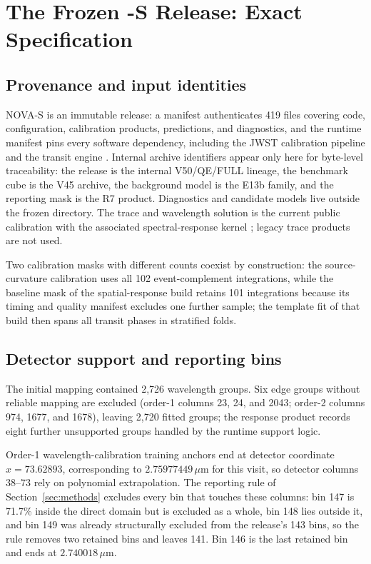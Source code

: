 \section{The Frozen \nova{}-S Release: Exact Specification}
\label{app:nova}

\subsection{Provenance and input identities}

NOVA-S is an immutable release: a manifest authenticates 419 files covering
code, configuration, calibration products, predictions, and diagnostics,
and the runtime manifest pins every software dependency, including the
JWST calibration pipeline \citep{JWSTPipeline2025} and the transit engine
\citep{Jaxoplanet2025}. Internal archive identifiers appear only here for
byte-level traceability: the release is the internal V50/QE/FULL lineage,
the benchmark cube is the V45 archive, the background model is the E13b
family, and the reporting mask is the R7 product. Diagnostics and
candidate models live outside the frozen directory. The trace and
wavelength solution is the current public calibration
\citep{BainesEtAl2023Trace,BainesEtAl2023Wavelength} with the associated
spectral-response kernel \citep{DarveauBernierEtAl2022}; legacy trace
products are not used.

Two calibration masks with different counts coexist by construction: the
source-curvature calibration uses all 102 event-complement integrations,
while the baseline mask of the spatial-response build retains 101
integrations because its timing and quality manifest excludes one further
sample; the template fit of that build then spans all transit phases in
stratified folds.

\subsection{Detector support and reporting bins}

The initial mapping contained 2{,}726 wavelength groups. Six edge groups
without reliable mapping are excluded (order-1 columns 23, 24, and 2043;
order-2 columns 974, 1677, and 1678), leaving 2{,}720 fitted groups; the
response product records eight further unsupported groups handled by the
runtime support logic.

Order-1 wavelength-calibration training anchors end at detector coordinate
$x=73.62893$, corresponding to $2.75977449\,\mu\mathrm{m}$ for this visit,
so detector columns 38--73 rely on polynomial extrapolation. The
reporting rule of Section~\ref{sec:methods} excludes every bin that
touches these columns: bin 147 is 71.7\% inside the direct domain but is
excluded as a whole, bin 148 lies outside it, and bin 149 was already
structurally excluded from the release's 143 bins, so the rule removes two
retained bins and leaves 141. Bin 146 is the last retained bin and ends at
$2.740018\,\mu\mathrm{m}$.


